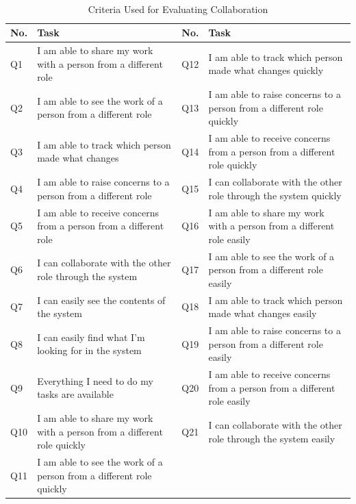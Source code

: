 \begin{table}
  \centering
  \caption{Criteria Used for Evaluating Collaboration}~\label{tab:itr2_questions}
  \addtolength{\tabcolsep}{2pt} 
  \begin{tabular}{p{.5cm}|p{2.75cm}|p{.5cm}|p{2.70cm}}
  	\toprule
    \rule{0pt}{8pt}No. & Task & No. & Task\\[2pt]
    \toprule
    Q1 & I am able to share my work with a person from a different role &  Q12 & I am able to track which person made what changes quickly\\
    Q2 &  I am able to see the work of a person from a different role  & Q13 & I am able to raise concerns to a person from a different role quickly\\
    Q3 & I am able to track which person made what changes & Q14 & I am able to receive concerns from a person from a different role quickly\\
    Q4 & I am able to raise concerns to a person from a different role & Q15 & I can collaborate with the other role through the system quickly\\
    Q5 & I am able to receive concerns from a person from a different role & Q16 & I am able to share my work with a person from a different role easily\\
    Q6 & I can collaborate with the other role through the system & Q17 & I am able to see the work of a person from a different role easily\\
    Q7 & I can easily see the contents of the system & Q18 & I am able to track which person made what changes easily\\
    Q8 & I can easily find what I'm looking for in the system & Q19 & I am able to raise concerns to a person from a different role easily\\
    Q9 & Everything I need to do my tasks are available  & Q20 & I am able to receive concerns from a person from a different role easily\\
    Q10 & I am able to share my work with a person from a different role quickly & Q21 & I can collaborate with the other role through the system easily\\
    Q11 & I am able to see the work of a person from a different role quickly & & \\
    \bottomrule
  \end{tabular}
  \addtolength{\tabcolsep}{-2pt} 
\end{table}

